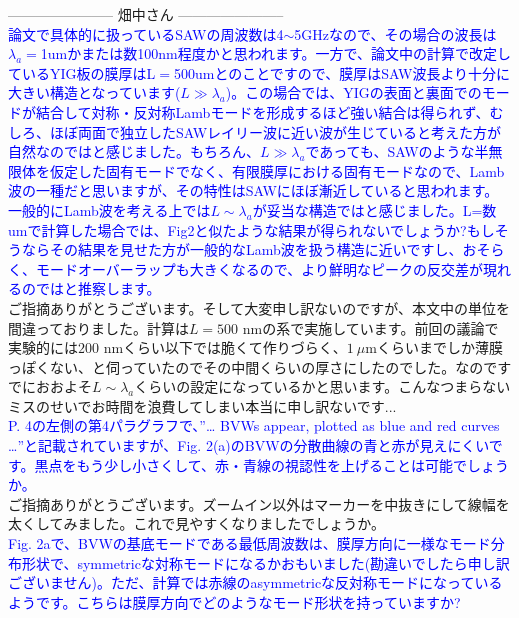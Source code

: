 \documentclass{jsarticle}
\begin{document}
-----------------------
畑中さん
-----------------------\\

\textcolor{blue}{論文で具体的に扱っているSAWの周波数は4$\sim$5GHzなので、その場合の波長は$\lambda_a=$1umかまたは数100nm程度かと思われます。一方で、論文中の計算で改定しているYIG板の膜厚はL$=$500umとのことですので、膜厚はSAW波長より十分に大きい構造となっています($L\gg\lambda_a$)。この場合では、YIGの表面と裏面でのモードが結合して対称・反対称Lambモードを形成するほど強い結合は得られず、むしろ、ほぼ両面で独立したSAWレイリー波に近い波が生じていると考えた方が自然なのではと感じました。もちろん、$L\gg\lambda_a$であっても、SAWのような半無限体を仮定した固有モードでなく、有限膜厚における固有モードなので、Lamb波の一種だと思いますが、その特性はSAWにほぼ漸近していると思われます。一般的にLamb波を考える上では$L\sim\lambda_a$が妥当な構造ではと感じました。L=数umで計算した場合では、Fig2と似たような結果が得られないでしょうか?もしそうならその結果を見せた方が一般的なLamb波を扱う構造に近いですし、おそらく、モードオーバーラップも大きくなるので、より鮮明なピークの反交差が現れるのではと推察します。}\\

ご指摘ありがとうございます。そして大変申し訳ないのですが、本文中の単位を間違っておりました。計算は$L=500$ nmの系で実施しています。前回の議論で実験的には$200$ nmくらい以下では脆くて作りづらく、$1\ \mu$mくらいまでしか薄膜っぽくない、と伺っていたのでその中間くらいの厚さにしたのでした。なのですでにおおよそ$L\sim\lambda_a$くらいの設定になっているかと思います。こんなつまらないミスのせいでお時間を浪費してしまい本当に申し訳ないです...\\

\textcolor{blue}{P. 4の左側の第4パラグラフで、”… BVWs appear, plotted as blue and red curves …”と記載されていますが、Fig. 2(a)のBVWの分散曲線の青と赤が見えにくいです。黒点をもう少し小さくして、赤・青線の視認性を上げることは可能でしょうか。}\\

ご指摘ありがとうございます。ズームイン以外はマーカーを中抜きにして線幅を太くしてみました。これで見やすくなりましたでしょうか。\\

\textcolor{blue}{Fig. 2aで、BVWの基底モードである最低周波数は、膜厚方向に一様なモード分布形状で、symmetricな対称モードになるかおもいました(勘違いでしたら申し訳ございません)。ただ、計算では赤線のasymmetricな反対称モードになっているようです。こちらは膜厚方向でどのようなモード形状を持っていますか?}\\
\end{document}
